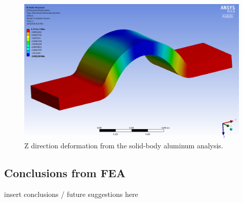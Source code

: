 \begin{figure}[htp]
\centering
\includegraphics[width=1\textwidth]{./figures/fea/fea-solid-al-def-z}
\caption{Z direction deformation from the solid-body aluminum analysis.}
\label{fig:fea-solid-al-def-z}
\end{figure}

\clearpage

\subsection{Conclusions from FEA}

insert conclusions / future suggestions here

\clearpage
